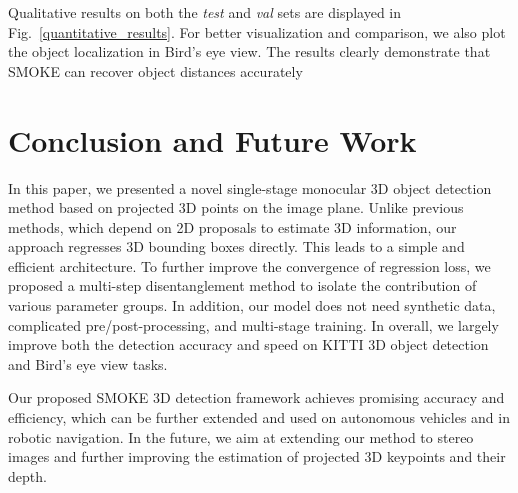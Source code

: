 \documentclass[10pt,twocolumn,letterpaper]{article}
\begin{document}
Qualitative results on both the \textit{test} and \textit{val} sets are displayed in Fig.~\ref{quantitative_results}. For better visualization and comparison, we also plot the object localization in Bird's eye view. The results clearly demonstrate that SMOKE can recover object distances accurately

\section{Conclusion and Future Work}
 In this paper, we presented a novel single-stage monocular 3D object detection method based on projected 3D points on the image plane. Unlike previous methods, which depend on 2D proposals to estimate 3D information, our approach regresses 3D bounding boxes directly. This leads to a simple and efficient architecture. To further improve the convergence of regression loss, we proposed a multi-step disentanglement method to isolate the contribution of various parameter groups. In addition, our model does not need synthetic data, complicated pre/post-processing, and multi-stage training. In overall, we largely improve both the detection accuracy and speed on KITTI 3D object detection and Bird's eye view tasks.

Our proposed SMOKE 3D detection framework achieves promising accuracy and efficiency, which can be further extended and used on autonomous vehicles and in robotic navigation. In the future, we aim at extending our method to stereo images and further improving the estimation of projected 3D keypoints and their depth.


{\small


}
\end{document}
